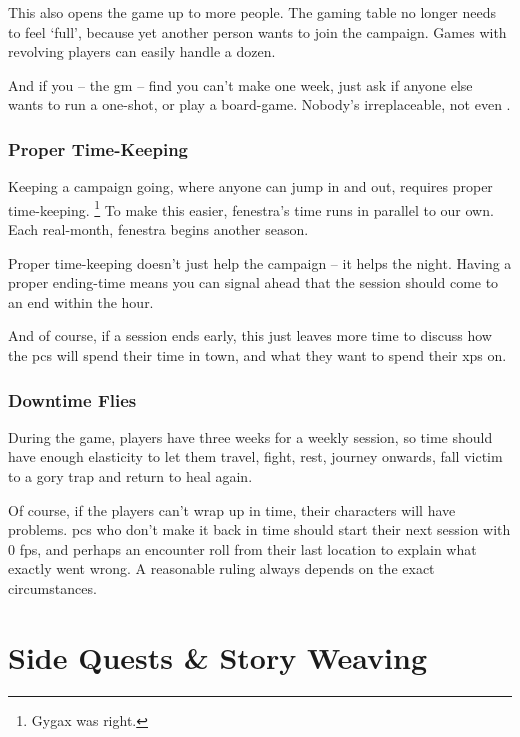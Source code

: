 \begin{multicols}{2}
This also opens the game up to more people.
The gaming table no longer needs to feel `full', because yet another person wants to join the campaign.
Games with revolving players can easily handle a dozen.

And if you -- the \gls{gm} -- find you can't make one week, just ask if anyone else wants to run a one-shot, or play a board-game.
Nobody's irreplaceable, not even .

\subsubsection{Proper Time-Keeping}

Keeping a campaign going, where anyone can jump in and out, requires proper time-keeping.%
\footnote{Gygax was right.}
To make this easier, \gls{fenestra}'s time runs in parallel to our own.
Each real-month, \gls{fenestra} begins another season.

Proper time-keeping doesn't just help the campaign -- it helps the night.
Having a proper ending-time means you can signal ahead that the session should come to an end within the hour.

And of course, if a session ends early, this just leaves more time to discuss how the \glspl{pc} will spend their time in town, and what they want to spend their \glspl{xp} on.

\subsubsection{Downtime Flies}

During the game, players have three weeks for a weekly session, so time should have enough elasticity to let them travel, fight, rest, journey onwards, fall victim to a gory trap and return to heal again.

Of course, if the players can't wrap up in time, their characters will have problems.
\Glspl{pc} who don't make it back in time should start their next session with 0 \glspl{fp}, and perhaps an encounter roll from their last location to explain what exactly went wrong.
A reasonable ruling always depends on the exact circumstances.

\end{multicols}

\section{Side Quests \& Story Weaving}

